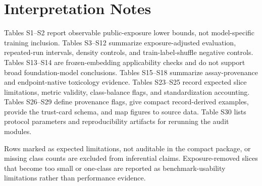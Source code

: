 \documentclass[10pt]{article}
\begin{document}
\section*{Interpretation Notes}

Tables S1--S2 report observable public-exposure lower bounds, not
model-specific training inclusion. Tables S3--S12 summarize exposure-adjusted
evaluation, repeated-run intervals, density controls, and train-label-shuffle
negative controls. Tables S13--S14 are frozen-embedding applicability checks and
do not support broad foundation-model conclusions. Tables S15--S18 summarize
assay-provenance and endpoint-native toxicology evidence. Tables S23--S25 record
expected slice limitations, metric validity, class-balance flags, and
standardization accounting. Tables S26--S29 define provenance flags, give compact
record-derived examples, provide the trust-card schema, and map figures to
source data. Table S30 lists protocol parameters and reproducibility artifacts
for rerunning the audit modules.

Rows marked as expected limitations, not auditable in the compact package, or
missing class counts are excluded from inferential claims. Exposure-removed
slices that become too small or one-class are reported as benchmark-usability
limitations rather than performance evidence.
\end{document}
